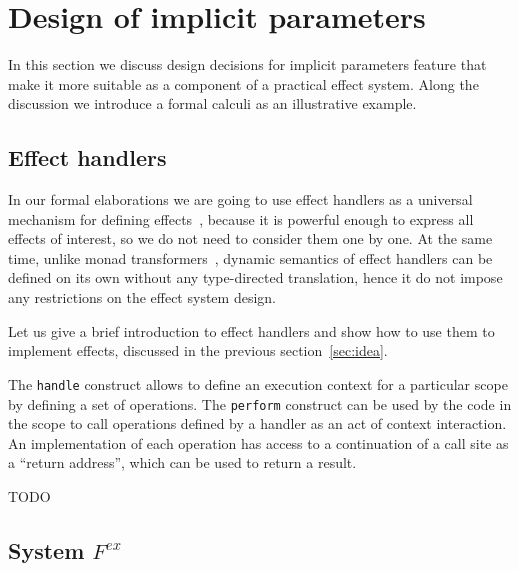\documentclass[acmsmall]{acmart}
\begin{document}
\section{Design of implicit parameters} \label{sec:implicits}

In this section we discuss design decisions for implicit parameters feature that make it more suitable as a component of a practical effect system.
Along the discussion we introduce a formal calculi as an illustrative example.

\subsection{Effect handlers} \label{subsec:handlers}

In our formal elaborations we are going to use effect handlers as a universal mechanism for defining effects~\cite{plotkin2003algebraic, plotkin2013handling}, because it is powerful enough to express all effects of interest, so we do not need to consider them one by one.
At the same time, unlike monad transformers~\cite{liang1995monad, schrijvers2019monad}, dynamic semantics of effect handlers can be defined on its own without any type-directed translation, hence it do not impose any restrictions on the effect system design.

Let us give a brief introduction to effect handlers and show how to use them to implement effects, discussed in the previous section~\ref{sec:idea}.

The \texttt{handle} construct allows to define an execution context for a particular scope by defining a set of operations.
The \texttt{perform} construct can be used by the code in the scope to call operations defined by a handler as an act of context interaction.
An implementation of each operation has access to a continuation of a call site as a ``return address'', which can be used to return a result. %





TODO %

\subsection{System $F^{ex}$} \label{subsec:core-lang}
\end{document}

